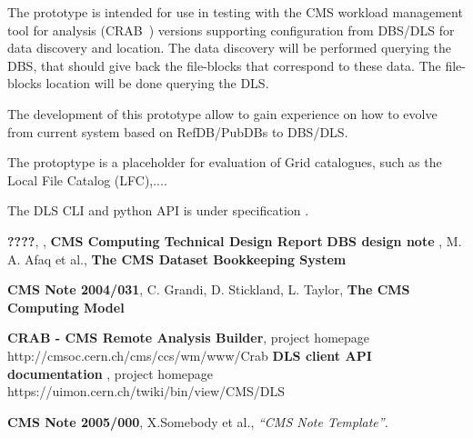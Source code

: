 \documentclass[pdftex]{cmspaper}
\begin{document}
   
   The prototype is intended for use in testing with the CMS workload 
   management tool for analysis (CRAB~\cite{CRAB}) versions supporting 
   configuration from DBS/DLS for data discovery and location.
   The data discovery will be performed querying the DBS, that
   should give back the file-blocks that correspond to these data.
   The file-blocks location will be done querying the DLS.

   The development of this prototype allow to gain experience on 
   how to evolve from current system based on RefDB/PubDBs
   to DBS/DLS.

   The protoptype is a placeholder for evaluation of Grid catalogues,
   such as the Local File Catalog (LFC),.... 

   The DLS CLI and python API is under specification \cite{DLSAPI}.


\begin{thebibliography}{9}
   {\bf ????}, , {\bf CMS Computing Technical Design Report}
   {\bf DBS design note }, M. A. Afaq et al., 
    {\bf The CMS Dataset Bookkeeping System}

   {\bf CMS Note 2004/031}, C. Grandi, D. Stickland,
               L. Taylor, {\bf The CMS Computing Model}

   {\bf CRAB - CMS Remote Analysis Builder}, project homepage
               http://cmsoc.cern.ch/cms/ccs/wm/www/Crab
   {\bf DLS client API documentation} , project homepage 
                   https://uimon.cern.ch/twiki/bin/view/CMS/DLS

   {\bf CMS Note 2005/000},
    X.Somebody et al.,
    {\em ``CMS Note Template''}.
\end{thebibliography}
 
\pagebreak
\end{document}
